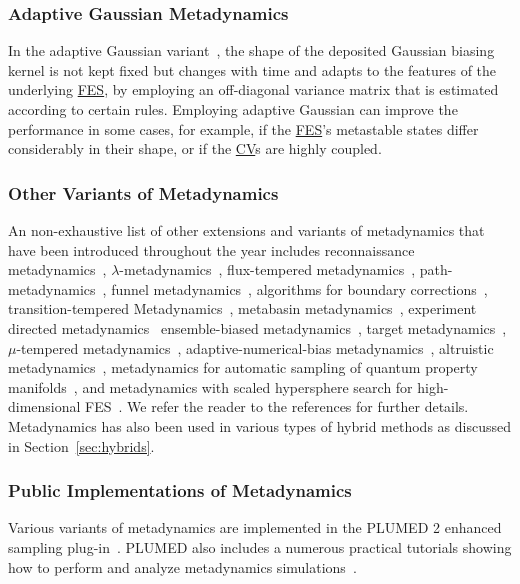 \documentclass[9pt,review]{livecoms}
\begin{document}
\subsubsection{Adaptive Gaussian Metadynamics}
In the adaptive Gaussian variant~\cite{Branduardi-JCTC-2012}, the shape of the deposited Gaussian biasing kernel is not kept fixed but changes with time and adapts to the features of the underlying \hyperlink{ref:FES} {FES}, by employing an off-diagonal variance matrix that is estimated according to certain rules. Employing adaptive Gaussian can improve the performance in some cases, for example, if the \hyperlink{ref:FES} {FES}'s metastable states differ considerably in their shape, or if the \hyperlink{ref:CV} {CV}s are highly coupled.

\subsubsection{Other Variants of Metadynamics}
\label{sec:metad_variants}
An non-exhaustive list of other extensions and variants of metadynamics that have been introduced throughout the year includes
reconnaissance metadynamics~\cite{10.1073/pnas.1011511107},
$\lambda$-metadynamics~\cite{10.1021/jz200808x},
flux-tempered metadynamics~\cite{Singh-JStatPhys-2011,Singh-JCTC-2012},
path-metadynamics~\cite{10.1103/physrevlett.109.020601,10.1063/1.5027392},
funnel metadynamics~\cite{10.1073/pnas.1303186110,10.1038/s41596-020-0342-4},
algorithms for boundary corrections~\cite{McGovern-JCP-2013},
transition-tempered Metadynamics~\cite{Dama-JCTC-2014}, metabasin metadynamics~\cite{10.1021/acs.jctc.5b00907},
experiment directed metadynamics~\cite{White_EDM_2015}
ensemble-biased metadynamics~\cite{Marinelli_EnsembleBiased_2015},
target metadynamics~\cite{GilLey_TargetMetaD_2016},
$\mu$-tempered metadynamics~\cite{10.1063/1.4937939},
adaptive-numerical-bias metadynamics~\cite{10.1002/jcc.25066},
altruistic metadynamics~\cite{10.1021/acs.jpcb.6b00087,10.1063/1.4978939},
metadynamics for automatic sampling of quantum property manifolds~\cite{Lindner_ASQPM-MetaD_2019},
and
metadynamics with scaled hypersphere search for high-dimensional FES~\cite{Mitsuta_SHS-MetaD_JCTC2020}.
We refer the reader to the references for further details. Metadynamics has also been used in various types of hybrid methods as discussed in Section~\ref{sec:hybrids}.

\subsubsection{Public Implementations of Metadynamics}
Various variants of metadynamics are implemented in the PLUMED 2 enhanced sampling plug-in~\cite{Bonomi-CPC-2009,Tribello2014,plumed-nest}. PLUMED also includes a numerous practical tutorials showing how to perform and analyze metadynamics simulations~\cite{plumed_masterclass}.
\end{document}
